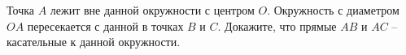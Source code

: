 \begin{ex}
	\begin{condition}
		Точка \( A  \) лежит вне данной окружности с центром \( O \). Окружность с диаметром \( OA  \) пересекается с данной в точках \( B \) и \( C \). Докажите, что прямые \( AB  \) и \( AC \) – касательные к данной окружности.
	\end{condition}
\end{ex}